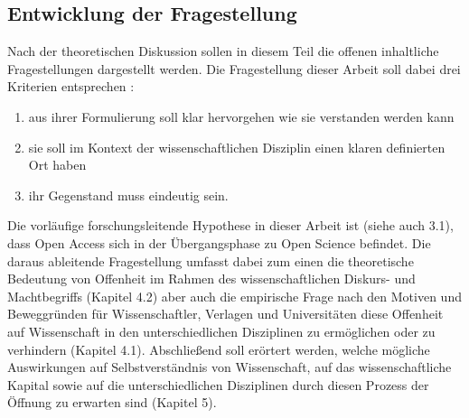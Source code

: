 \subsection{Entwicklung der Fragestellung}
Nach der theoretischen Diskussion sollen in diesem Teil die offenen inhaltliche Fragestellungen dargestellt werden.  Die Fragestellung dieser Arbeit soll dabei drei Kriterien entsprechen :
\begin{enumerate}
\item aus ihrer Formulierung soll klar hervorgehen wie sie verstanden werden kann
\item sie soll im Kontext der wissenschaftlichen Disziplin einen klaren definierten Ort haben 
\item ihr Gegenstand muss eindeutig sein.
\end{enumerate}
Die vorläufige forschungsleitende Hypothese in dieser Arbeit ist (siehe auch 3.1), dass Open Access sich in der Übergangsphase zu Open Science befindet. Die daraus ableitende Fragestellung umfasst dabei zum einen die theoretische Bedeutung von Offenheit im Rahmen des wissenschaftlichen Diskurs- und Machtbegriffs (Kapitel 4.2) aber auch die empirische Frage nach den Motiven und Beweggründen für Wissenschaftler, Verlagen und Universitäten diese Offenheit auf Wissenschaft in den unterschiedlichen Disziplinen zu ermöglichen oder zu verhindern (Kapitel 4.1). Abschließend soll erörtert werden, welche mögliche Auswirkungen auf Selbstverständnis von Wissenschaft, auf das wissenschaftliche Kapital sowie auf die unterschiedlichen Disziplinen durch diesen Prozess der Öffnung zu erwarten sind (Kapitel 5).
